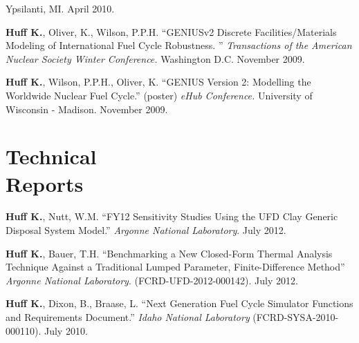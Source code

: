 \documentclass[margin,line]{resume}
\begin{document}
\begin{resume}
\begin{bibenum}
        Ypsilanti, MI. April 2010.
      \item \textbf{Huff K.}, Oliver, K., Wilson, P.P.H. ``GENIUSv2 Discrete Facilities/Materials Modeling of International 
        Fuel Cycle Robustness. ''
         \emph{Transactions of the American Nuclear Society Winter Conference.} 
        Washington D.C. November 2009. 
      \item \textbf{Huff K.}, Wilson, P.P.H., Oliver, K. ``GENIUS Version 2: Modelling the Worldwide Nuclear Fuel Cycle.'' 
        (poster)  \emph{eHub Conference.} University of Wisconsin - 
        Madison. November 2009.
    \end{bibenum}

    \section{\mysidestyle Technical\\Reports}
    \begin{bibenum}
      \item \textbf{Huff K.}, Nutt, W.M. ``FY12 Sensitivity Studies Using the UFD Clay Generic Disposal System Model.'' 
        \emph{Argonne National Laboratory}. July 2012.
      \item \textbf{Huff K.}, Bauer, T.H. ``Benchmarking a New Closed-Form Thermal Analysis Technique Against a Traditional
        Lumped Parameter, Finite-Difference Method'' \emph{Argonne National Laboratory}. (FCRD-UFD-2012-000142). July 2012.
      \item \textbf{Huff K.}, Dixon, B., Braase, L. ``Next Generation Fuel Cycle Simulator Functions and Requirements Document.'' 
        \emph{Idaho National Laboratory} (FCRD-SYSA-2010-000110). July 2010. 
    \end{bibenum}
    \pagebreak

\end{resume}
\end{document}
